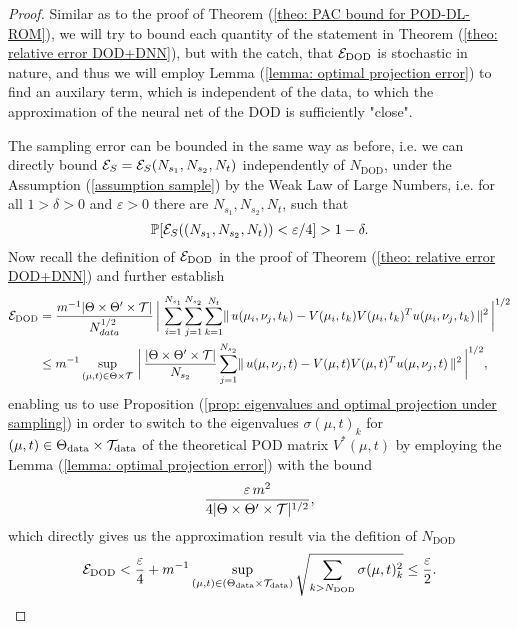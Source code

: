 \begin{proof}
    Similar as to the proof of Theorem (\ref{theo: PAC bound for POD-DL-ROM}), we will try to bound each quantity
    of the statement in Theorem (\ref{theo: relative error DOD+DNN}), but with the catch, that $\mathcal{E}_{\text{DOD}}$ is
    stochastic in nature, and thus we will employ Lemma (\ref{lemma: optimal projection error}) to find an auxilary term,
    which is independent of the data, to which the approximation of the neural net of the DOD is sufficiently "close". 
    
    The sampling error can be bounded in the same way as before, i.e. we can directly bound 
    $\mathcal{E}_S = \mathcal{E}_S(N_{s_1}, N_{s_2}, N_t)$ independently of $N_{\text{DOD}}$, under the Assumption (\ref{assumption sample})
    by the Weak Law of Large Numbers, i.e. for all $1 > \delta > 0$ and $\varepsilon > 0$ there are $N_{s_1}, N_{s_2}, N_t$, such that
    \begin{equation} \label{eq: S error dod-dl-rom}
        \mathbb{P}[\mathcal{E}_S((N_{s_1}, N_{s_2}, N_t)) < \varepsilon / 4] > 1 - \delta.
    \end{equation}
    Now recall the definition of $\mathcal{E}_{\text{DOD}}$ in the proof of Theorem (\ref{theo: relative error DOD+DNN}) and 
    further establish
    \begin{align*}
        \mathcal{E}_{\text{DOD}} &= \frac{m^{-1} \vert \Theta \times \Theta' \times \mathcal{T} \vert}{N_{data}^{1/2}} 
        \, \bigg\vert \, \sum_{i = 1}^{N_{s_1}} \sum_{j = 1}^{N_{s_2}} \sum_{k = 1}^{N_t} 
        \lVert \, u(\mu_i, \nu_j, t_k) - V(\mu_i, t_k) V(\mu_i, t_k)^T u(\mu_i, \nu_j, t_k) \, \rVert^2 \, \bigg\vert^{1/2} \\
        &\leq m^{-1} \sup\limits_{(\mu, t) \in \Theta \times \mathcal{T}} \, \bigg\vert \, 
        \frac{\vert \Theta \times \Theta' \times \mathcal{T} \vert}{N_{s_2}}  \sum_{j = 1}^{N_{s_2}} 
        \lVert \, u(\mu, \nu_j, t) - V(\mu, t) V(\mu, t)^T u(\mu, \nu_j, t) \, \rVert^2 \, \bigg\vert^{1/2}, 
    \end{align*}
    enabling us to use Proposition (\ref{prop: eigenvalues and optimal projection under sampling}) in order 
    to switch to the eigenvalues $\sigma(\mu, t)_k$ for $(\mu, t) \in \Theta_{\text{data}} \times \mathcal{T}_{\text{data}}$
    of the theoretical POD matrix $V^*(\mu, t)$ by employing the Lemma (\ref{lemma: optimal projection error}) with 
    the bound
    \begin{equation*}
        \frac{\varepsilon \, m^2}{4 \vert \Theta \times \Theta' \times \mathcal{T} \vert^{1/2}},
    \end{equation*}
    which directly gives us the approximation result via the defition of $N_{\text{DOD}}$
    \begin{equation} \label{eq: dod error dod-dl-rom}
        \mathcal{E}_{\text{DOD}} < \frac{\varepsilon}{4} + 
        m^{-1} \sup\limits_{(\mu, t) \in (\Theta_{\text{data}} \times \mathcal{T}_{\text{data}})} 
        \sqrt{\sum_{k > N_{\text{DOD}}} \sigma(\mu, t)_k^2} 
        \leq \frac{\varepsilon}{2}.
    \end{equation}


\end{proof}
